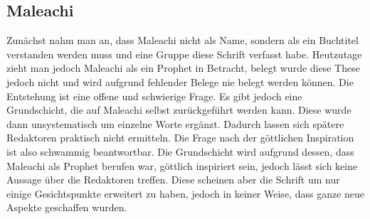\subsection*{Maleachi}
Zunächst nahm man an, dass Maleachi nicht als Name, sondern als ein Buchtitel verstanden werden muss und eine Gruppe diese Schrift verfasst habe. Heutzutage zieht man jedoch Maleachi als ein Prophet in Betracht, belegt wurde diese These jedoch nicht und wird aufgrund fehlender Belege nie belegt werden können. Die Entstehung ist eine offene und schwierige Frage. Es gibt jedoch eine Grundschicht, die auf Maleachi selbst zurückgeführt werden kann. Diese wurde dann unsystematisch um einzelne Worte ergänzt. Dadurch lassen sich spätere Redaktoren praktisch nicht ermitteln. Die Frage nach der göttlichen Inspiration ist also schwammig beantwortbar. Die Grundschicht wird aufgrund dessen, dass Maleachi als Prophet berufen war, göttlich inspiriert sein, jedoch lässt sich keine Aussage über die Redaktoren treffen. Diese scheinen aber die Schrift um nur einige Gesichtspunkte erweitert zu haben, jedoch in keiner Weise, dass ganze neue Aspekte geschaffen wurden.


